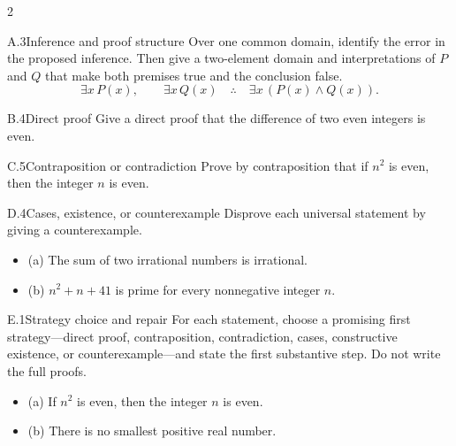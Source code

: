 \documentclass[9pt]{extarticle}
\begin{document}
\begin{multicols}{2}
\begin{CoreProblem}{A.3}{Inference and proof structure}
Over one common domain, identify the error in the proposed inference. Then give
a two-element domain and interpretations of $P$ and $Q$ that make both premises
true and the conclusion false.
\[
\exists x\,P(x),\qquad \exists x\,Q(x)
\quad\therefore\quad
\exists x\,(P(x)\land Q(x)).
\]
\end{CoreProblem}
\begin{CoreProblem}{B.4}{Direct proof}
Give a direct proof that the difference of two even integers is even.
\end{CoreProblem}
\begin{CoreProblem}{C.5}{Contraposition or contradiction}
Prove by contraposition that if $n^2$ is even, then the integer $n$ is even.
\end{CoreProblem}
\columnbreak
\begin{CoreProblem}{D.4}{Cases, existence, or counterexample}
Disprove each universal statement by giving a counterexample.
\begin{itemize}
  \item (a) The sum of two irrational numbers is irrational.
  \item (b) $n^2+n+41$ is prime for every nonnegative integer $n$.
\end{itemize}
\end{CoreProblem}
\begin{CoreProblem}{E.1}{Strategy choice and repair}
For each statement, choose a promising first strategy---direct proof,
contraposition, contradiction, cases, constructive existence, or
counterexample---and state the first substantive step. Do not write the full
proofs.
\begin{itemize}
  \item (a) If $n^2$ is even, then the integer $n$ is even.
  \item (b) There is no smallest positive real number.
\end{itemize}
\end{CoreProblem}
\end{multicols}
\CoreWorkArea
\FormBreak
{}
\end{document}
